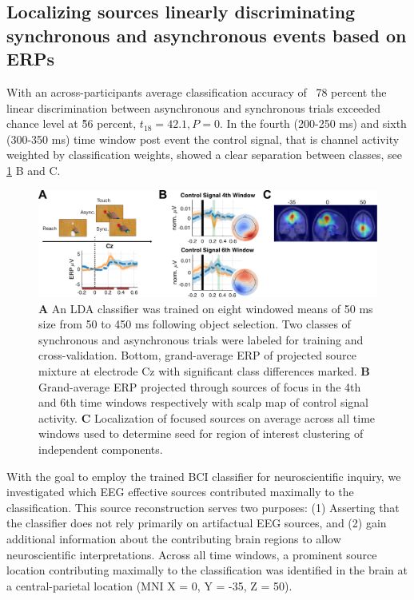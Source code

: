 \subsection{Localizing sources linearly discriminating synchronous and asynchronous events based on ERPs}
With an across-participants average classification accuracy of ~78 percent the linear discrimination between asynchronous and synchronous trials exceeded chance level at \~56 percent, $t_{18} = 42.1, P = 0$. In the fourth (200-250 ms) and sixth (300-350 ms) time window post event the control signal, that is channel activity weighted by classification weights, showed a clear separation between classes, see \ref{lda} B and C.
\begin{figure}[h]
  \includegraphics[width=\textwidth]{figures/fig2_discrimination_short.pdf}
  \caption{\textbf{A} An LDA classifier was trained on eight windowed means of 50 ms size from 50 to 450 ms following object selection. Two classes of synchronous and asynchronous trials were labeled for training and cross-validation. Bottom, grand-average ERP of projected source mixture at electrode Cz with significant class differences marked. \textbf{B} Grand-average ERP projected through sources of focus in the 4th and 6th time windows respectively with scalp map of control signal activity. \textbf{C} Localization of focused sources on average across all time windows used to determine seed for region of interest clustering of independent components.}
  \label{lda}
\end{figure}
With the goal to employ the trained BCI classifier for neuroscientific inquiry, we investigated which EEG effective sources contributed maximally to the classification. This source reconstruction serves two purposes: (1) Asserting that the classifier does not rely primarily on artifactual EEG sources, and (2) gain additional information about the contributing brain regions to allow neuroscientific interpretations. Across all time windows, a prominent source location contributing maximally to the classification was identified in the brain at a central-parietal location (MNI X = 0, Y = -35, Z = 50).

